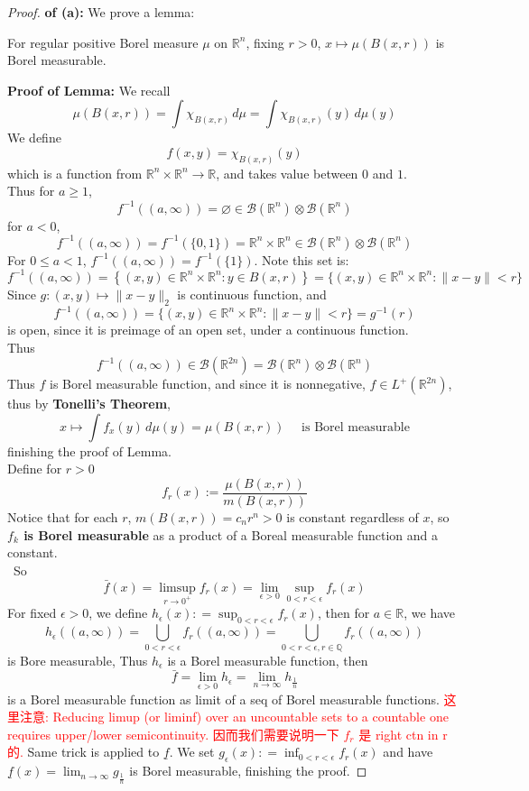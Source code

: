 \documentclass[lang=cn,11pt]{elegantbook}
\begin{document}
\begin{proof}
    \textbf{of (a):}
We prove a lemma:    
\begin{lemma}
For regular positive Borel measure $\mu$ on $\mathbb{R}^n$, fixing $r >0$, $x \mapsto \mu(B(x,r))$ is Borel measurable.\end{lemma}
\textbf{Proof of Lemma: }We recall \[
 \mu(B(x,r)) = \int \chi_{B(x,r)}  \, d\mu  = \int \chi_{B(x,r)}(y)  \, d\mu (y)
\]
We define \[
f(x,y) =  \chi_{B(x,r)}(y)
\]
which is a function from $\mathbb{R}^n \times \mathbb{R}^n \to \mathbb{R}$, and takes value between $0$ and $1$.\\
Thus for $a \geq 1$, \[
f^{-1}((a,\infty)) = \varnothing  \in \mathcal{B}(\mathbb{R}^{n})\otimes \mathcal{B}(\mathbb{R}^{n})
 \]
 for $a <  0$, \[
 f^{-1}((a,\infty)) =  f^{-1} (\{ 0,1\})  = \mathbb{R}^n \times \mathbb{R}^n  \in   \mathcal{B}(\mathbb{R}^{n})\otimes \mathcal{B}(\mathbb{R}^{n})
 \]
For $0 \leq a < 1$, $ f^{-1}((a,\infty)) = f^{-1} (\{ 1\})$. Note this set is: \[
f^{-1}((a,\infty)) = \left\{(x, y) \in \mathbb{R}^n \times \mathbb{R}^n: y \in B(x, r)\right\}=\{(x, y)\in \mathbb{R}^n \times \mathbb{R}^n:\|x-y\|<r\}
\]
Since $g: (x,y) \mapsto \|x-y\|_2$ is continuous function, and \[
f^{-1}((a,\infty)) = \{(x, y)\in \mathbb{R}^n \times \mathbb{R}^n:\|x-y\|<r\} = g^{-1} (r)
\]
is open, since it is preimage of an open set, under a continuous function.\\
Thus \[
f^{-1}((a,\infty)) \in \mathcal{B}(\mathbb{R}^{2n}) = \mathcal{B}(\mathbb{R}^{n})\otimes \mathcal{B}(\mathbb{R}^{n})
\]
Thus $f$ is Borel measurable function, and since it is nonnegative, $f \in L^+(\mathbb{R}^{2n})$, thus by \textbf{Tonelli's Theorem}, \[
x \mapsto \int  f_x(y)\, d\mu(y) =  \mu(B(x,r)) \quad \text{ is Borel measurable}
\]finishing the proof of Lemma.\\
Define for $r > 0$ \[
f_r(x):=\frac{\mu(B\left(x, r\right))}{m(B\left(x, r\right))}
\]
Notice that for each $r$, $ m(B(x, r))=c_n r^n > 0 $ is constant regardless of $x$, so \textbf{$f_k$ is Borel measurable} as a product of a Boreal measurable function and a constant.\\\ 
So \[
\bar{f}(x)=\limsup _{r \to  0^+} f_r(x) =  \lim_{\epsilon > 0} \sup_{0< r < \epsilon} f_r(x)
\]
For fixed $\epsilon > 0$, we define $h_\epsilon (x): = \sup_{0< r < \epsilon} f_r(x)$, then for $a \in \mathbb{R}$, we have \[
h_{\epsilon} ((a,\infty))  = \bigcup_{0< r< \epsilon}  f_r ((a,\infty)) =  \bigcup_{0< r< \epsilon,r\in \mathbb{Q}}  f_r ((a,\infty))
\]is Bore measurable, Thus $h_\epsilon$ is a Borel measurable function, then \[
\bar{f} = \lim_{\epsilon > 0}h_\epsilon = \lim_{n \to  \infty }h_{\frac{1}{n}}
\]is a Borel measurable function as limit of a seq of Borel measurable functions. 
\textcolor{red}{这里注意: Reducing limup (or liminf) over an uncountable sets to a countable one requires upper/lower semicontinuity. 因而我们需要说明一下 $f_r$ 是 right ctn in r 的.}
Same trick is applied to $\underline{f}$. We set $g_\epsilon (x): = \inf_{0< r < \epsilon} f_r(x)$ and have  \(\underline{f}(x)=  \lim_{n \to  \infty }g_{\frac{1}{n}}\) is Borel measurable, finishing the proof.
\end{proof}
\end{document}
